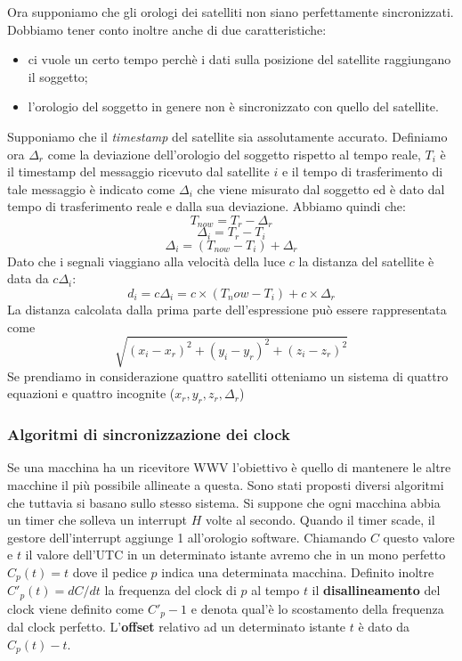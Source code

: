 Ora supponiamo che gli orologi dei satelliti non siano perfettamente sincronizzati. Dobbiamo tener conto inoltre anche di due caratteristiche:
\begin{itemize}
\item ci vuole un certo tempo perchè i dati sulla posizione del satellite raggiungano il soggetto;
\item l'orologio del soggetto in genere non è sincronizzato con quello del satellite.
\end{itemize}
Supponiamo che il \emph{timestamp} del satellite sia assolutamente accurato. Definiamo ora $\Delta_r$ come la deviazione dell'orologio del soggetto rispetto al tempo reale, $T_i$ è il timestamp del messaggio ricevuto dal satellite $i$ e il tempo di trasferimento di tale messaggio è indicato come $\Delta_i$ che viene misurato dal soggetto ed è dato dal tempo di trasferimento reale e dalla sua deviazione. Abbiamo quindi che:
$$T_{now} = T_r - \Delta_r$$
$$\Delta_i = T_r - T_i$$
$$\Delta_i = (T_{now} - T_i)+\Delta_r$$
Dato che i segnali viaggiano alla velocità della luce $c$ la distanza del satellite è data da $c\Delta_i$:
$$d_i = c \Delta_i = c \times (T_now - T_i) + c \times \Delta_r$$
La distanza calcolata dalla prima parte dell'espressione può essere rappresentata come 
$$\sqrt{(x_i-x_r)^2+(y_i-y_r)^2+ (z_i-z_r)^2}$$
Se prendiamo in considerazione quattro satelliti otteniamo un sistema di quattro  equazioni e quattro incognite ($x_r,y_r,z_r,\Delta_r$)
\subsubsection{Algoritmi di sincronizzazione dei clock}
Se una macchina ha un ricevitore WWV l'obiettivo è quello di mantenere le altre macchine il più possibile allineate a questa. Sono stati proposti diversi algoritmi che tuttavia si basano sullo stesso sistema. Si suppone che ogni macchina abbia un timer che solleva un interrupt $H$ volte al secondo. Quando il timer scade, il gestore dell'interrupt aggiunge 1 all'orologio software. Chiamando $C$ questo valore  e $t$ il valore dell'UTC in un determinato istante avremo che in un mono perfetto $C_p(t) = t$ dove il pedice $p$ indica una determinata macchina. Definito inoltre $C'_p(t) = dC/dt$ la frequenza del clock di $p$ al tempo $t$ il \textbf{disallineamento} del clock viene definito come $C'_p - 1$ e denota qual'è lo scostamento della frequenza dal clock perfetto. L'\textbf{offset} relativo ad un determinato istante $t$ è dato da  $C_p(t)-t$.
